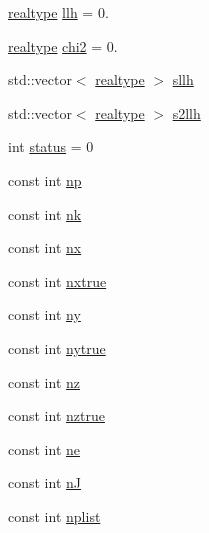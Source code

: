 \begin{DoxyCompactItemize}
\item 
\mbox{\hyperlink{namespaceamici_a1bdce28051d6a53868f7ccbf5f2c14a3}{realtype}} \mbox{\hyperlink{classamici_1_1_return_data_a35c3d895b14746807521fa6ba8ead52b}{llh}} = 0.
\item 
\mbox{\hyperlink{namespaceamici_a1bdce28051d6a53868f7ccbf5f2c14a3}{realtype}} \mbox{\hyperlink{classamici_1_1_return_data_a473f438e422f5fbf6c5753a95b3324fe}{chi2}} = 0.
\item 
std\+::vector$<$ \mbox{\hyperlink{namespaceamici_a1bdce28051d6a53868f7ccbf5f2c14a3}{realtype}} $>$ \mbox{\hyperlink{classamici_1_1_return_data_a1696cb94c7712b468ee3e021c6df0c89}{sllh}}
\item 
std\+::vector$<$ \mbox{\hyperlink{namespaceamici_a1bdce28051d6a53868f7ccbf5f2c14a3}{realtype}} $>$ \mbox{\hyperlink{classamici_1_1_return_data_a4087bea95b64c7ecc21bb4c487b255d9}{s2llh}}
\item 
int \mbox{\hyperlink{classamici_1_1_return_data_a6e27f49150e9a14580fb313cc2777e00}{status}} = 0
\item 
const int \mbox{\hyperlink{classamici_1_1_return_data_a72e833f8ef129cac553feb1167223bc3}{np}}
\item 
const int \mbox{\hyperlink{classamici_1_1_return_data_a5e273eaccc1df0343f5a1d4d136f2f2c}{nk}}
\item 
const int \mbox{\hyperlink{classamici_1_1_return_data_a4f88110916f09b2adef33396203ff015}{nx}}
\item 
const int \mbox{\hyperlink{classamici_1_1_return_data_acf5766cc8560edbdcec5b8ef79459239}{nxtrue}}
\item 
const int \mbox{\hyperlink{classamici_1_1_return_data_a811734e12750524808dba01c57e92c66}{ny}}
\item 
const int \mbox{\hyperlink{classamici_1_1_return_data_a54bcfe56ad0df183516d096adf4e0b26}{nytrue}}
\item 
const int \mbox{\hyperlink{classamici_1_1_return_data_aa406c307f97060d218bc1fe594dfd08f}{nz}}
\item 
const int \mbox{\hyperlink{classamici_1_1_return_data_a9a451378ba5572ef7a3fd4dd89e1c227}{nztrue}}
\item 
const int \mbox{\hyperlink{classamici_1_1_return_data_a07d5274358ec39bfec473cd212a3cb78}{ne}}
\item 
const int \mbox{\hyperlink{classamici_1_1_return_data_a0d2f49d2b15b08628451261e52f56e4f}{nJ}}
\item 
const int \mbox{\hyperlink{classamici_1_1_return_data_a2375af1667e955ed7a61ade0868f735a}{nplist}}

\end{DoxyCompactItemize}
